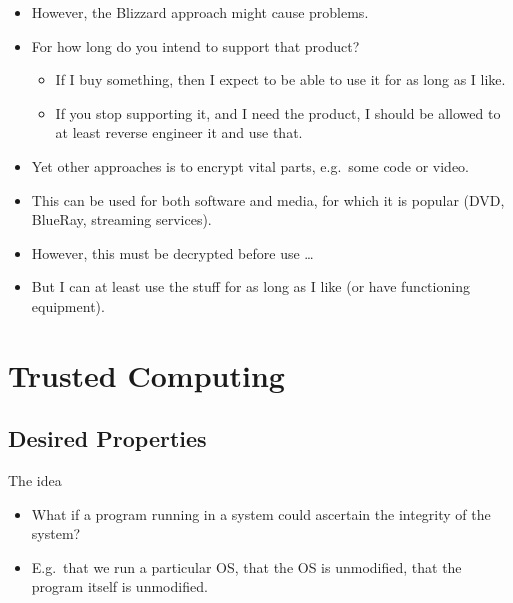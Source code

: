 \documentclass{beamer}
\begin{document}
\begin{frame}
  \begin{itemize}
    \item However, the Blizzard approach might cause problems.
    \item For how long do you intend to support that product?
      \begin{itemize}
        \item If I buy something, then I expect to be able to use it for as 
          long as I like.
        \item If you stop supporting it, and I need the product, I should be 
          allowed to at least reverse engineer it and use that.
      \end{itemize}
  \end{itemize}
\end{frame}

\begin{frame}
  \begin{itemize}
    \item Yet other approaches is to encrypt vital parts, e.g.\ some code or 
      video.

    \item This can be used for both software and media, for which it is popular 
      (DVD, BlueRay, streaming services).

    \item However, this must be decrypted before use \dots

    \item But I can at least use the stuff for as long as I like (or have 
      functioning equipment).
  \end{itemize}
\end{frame}


\section{Trusted Computing}

\subsection{Desired Properties}

\begin{frame}
  \begin{block}{The idea}
    \begin{itemize}
      \item What if a program running in a system could ascertain the integrity 
        of the system?

      \item E.g.\ that we run a particular OS, that the OS is unmodified, that 
        the program itself is unmodified.

    \end{itemize}
  \end{block}
\end{frame}
\end{document}
